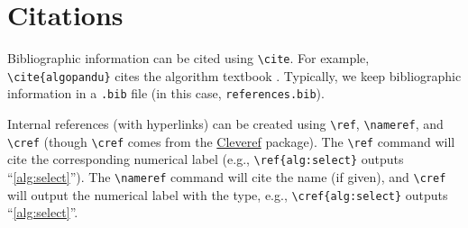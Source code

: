 \section{Citations}
Bibliographic information can be cited using \verb|\cite|. For example, \verb|\cite{algopandu}| cites the algorithm textbook \cite{algopandu}.
Typically, we keep bibliographic information in a \texttt{.bib} file (in this case, \texttt{references.bib}).

Internal references (with hyperlinks) can be created using \verb|\ref|, \verb|\nameref|, and \verb|\cref| (though \verb|\cref| comes from the
\href{https://ctan.org/pkg/cleveref}{Cleveref} package). The \verb|\ref| command will cite the corresponding numerical label (e.g.,
\verb|\ref{alg:select}| outputs ``\ref{alg:select}''). The \verb|\nameref| command will cite the name (if given), and \verb|\cref| will
output the numerical label with the type, e.g., \verb|\cref{alg:select}| outputs ``\cref{alg:select}''.